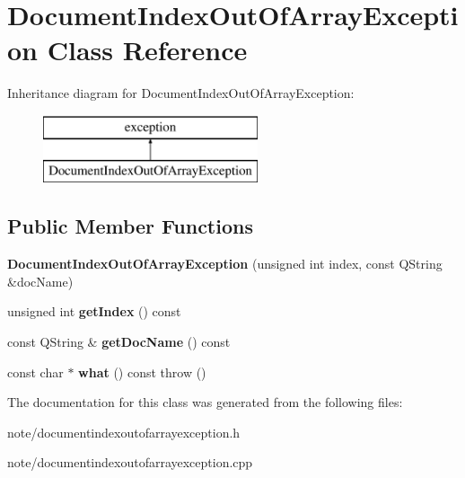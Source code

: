 \hypertarget{class_document_index_out_of_array_exception}{\section{Document\-Index\-Out\-Of\-Array\-Exception Class Reference}
\label{class_document_index_out_of_array_exception}
}
Inheritance diagram for Document\-Index\-Out\-Of\-Array\-Exception\-:\begin{figure}[H]
\begin{center}
\leavevmode
\includegraphics[height=2.000000cm]{class_document_index_out_of_array_exception}
\end{center}
\end{figure}
\subsection*{Public Member Functions}
\begin{DoxyCompactItemize}
\item 
\hypertarget{class_document_index_out_of_array_exception_a236ec0fd0e414dcd4b025fac7d483a45}{{\bfseries Document\-Index\-Out\-Of\-Array\-Exception} (unsigned int index, const Q\-String \&doc\-Name)}\label{class_document_index_out_of_array_exception_a236ec0fd0e414dcd4b025fac7d483a45}

\item 
\hypertarget{class_document_index_out_of_array_exception_a741d247d3b6798b80b83d6f774c9ebd5}{unsigned int {\bfseries get\-Index} () const }\label{class_document_index_out_of_array_exception_a741d247d3b6798b80b83d6f774c9ebd5}

\item 
\hypertarget{class_document_index_out_of_array_exception_a1dc5d9b8dbff2012452fc9fea6cab832}{const Q\-String \& {\bfseries get\-Doc\-Name} () const }\label{class_document_index_out_of_array_exception_a1dc5d9b8dbff2012452fc9fea6cab832}

\item 
\hypertarget{class_document_index_out_of_array_exception_a7496009a3ae995eed304c9c19f74651c}{const char $\ast$ {\bfseries what} () const   throw ()}\label{class_document_index_out_of_array_exception_a7496009a3ae995eed304c9c19f74651c}

\end{DoxyCompactItemize}


The documentation for this class was generated from the following files\-:\begin{DoxyCompactItemize}
\item 
note/documentindexoutofarrayexception.\-h\item 
note/documentindexoutofarrayexception.\-cpp\end{DoxyCompactItemize}
